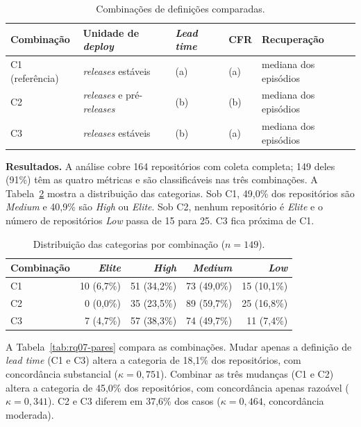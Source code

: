 \begin{table}[ht]
\centering
\caption{Combina\c{c}\~oes de defini\c{c}\~oes comparadas.}
\label{tab:rq07-combinacoes}
\small
\begin{tabular}{lllll}
\hline
Combina\c{c}\~ao & Unidade de \textit{deploy} & \textit{Lead time} & CFR & Recupera\c{c}\~ao \\
\hline
C1 (refer\^encia) & \textit{releases} est\'aveis & (a) & (a) & mediana dos epis\'odios \\
C2 & \textit{releases} e pr\'e-\textit{releases} & (b) & (b) & mediana dos epis\'odios \\
C3 & \textit{releases} est\'aveis & (b) & (a) & mediana dos epis\'odios \\
\hline
\end{tabular}
\end{table}

\textbf{Resultados.} A an\'alise cobre 164 reposit\'orios com coleta completa; 149 deles
(91\%) t\^em as quatro m\'etricas e s\~ao classific\'aveis nas tr\^es combina\c{c}\~oes. A
Tabela~\ref{tab:rq07-dist} mostra a distribui\c{c}\~ao das categorias. Sob C1, 49,0\% dos
reposit\'orios s\~ao \textit{Medium} e 40,9\% s\~ao \textit{High} ou \textit{Elite}. Sob C2,
nenhum reposit\'orio \'e \textit{Elite} e o n\'umero de reposit\'orios \textit{Low} passa de 15
para 25. C3 fica pr\'oxima de C1.

\begin{table}[ht]
\centering
\caption{Distribui\c{c}\~ao das categorias por combina\c{c}\~ao ($n = 149$).}
\label{tab:rq07-dist}
\small
\begin{tabular}{lrrrr}
\hline
Combina\c{c}\~ao & \textit{Elite} & \textit{High} & \textit{Medium} & \textit{Low} \\
\hline
C1 & 10 (6,7\%) & 51 (34,2\%) & 73 (49,0\%) & 15 (10,1\%) \\
C2 & 0 (0,0\%) & 35 (23,5\%) & 89 (59,7\%) & 25 (16,8\%) \\
C3 & 7 (4,7\%) & 57 (38,3\%) & 74 (49,7\%) & 11 (7,4\%) \\
\hline
\end{tabular}
\end{table}

A Tabela~\ref{tab:rq07-pares} compara as combina\c{c}\~oes. Mudar apenas a defini\c{c}\~ao de
\textit{lead time} (C1 e C3) altera a categoria de 18,1\% dos reposit\'orios, com
concord\^ancia substancial ($\kappa = 0{,}751$). Combinar as tr\^es mudan\c{c}as (C1 e C2) altera
a categoria de 45,0\% dos reposit\'orios, com concord\^ancia apenas razo\'avel
($\kappa = 0{,}341$). C2 e C3 diferem em 37,6\% dos casos ($\kappa = 0{,}464$, concord\^ancia
moderada).

